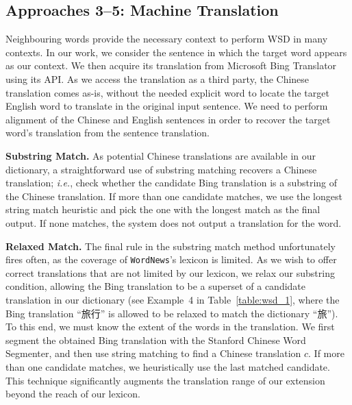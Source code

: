 \begin{CJK}{UTF8}{gbsn}
\subsection{Approaches 3--5: Machine Translation}

Neighbouring words provide the necessary context to perform WSD in
many contexts. In our work, we consider the sentence in which the
target word appears as our context. We then acquire its translation
from Microsoft Bing
Translator using its
API.  As we access the translation as a third party, the Chinese
translation comes as-is, without the needed explicit word  to
locate the target English word to translate in the original input
sentence. We need to perform alignment of the Chinese and English
sentences in order to recover the target word's translation from the
sentence translation.

{\bf Substring Match.} As potential Chinese translations are
available in our dictionary, a straightforward use of substring
matching recovers a Chinese translation; {\it i.e.}, check whether the
candidate %
Bing translation is a substring of the Chinese translation. 
If more than one candidate matches, we use the longest
string match heuristic and pick the one with the longest match as the
final output. If none matches, the system does not output a translation
for the word.  

{\bf Relaxed Match.} The final rule in the substring match method
unfortunately fires often, as the coverage of {\tt WordNews}'s lexicon
is limited.  As we wish to offer correct translations that are not
limited by our lexicon, we relax our substring condition, allowing the
Bing translation to be a superset of a candidate translation in our
dictionary (see Example~4 in Table~\ref{table:wsd_1}, where the Bing
translation ``旅行'' is allowed to be relaxed to match the dictionary
``旅'').
To this end, we must know the extent of the words in the translation.
We first segment the obtained Bing translation with the Stanford
Chinese Word Segmenter, and then use string matching to find a Chinese
translation $c$.  
If more than one candidate matches, we heuristically 
use the last matched candidate. 
This technique significantly augments the
translation range of our extension beyond the reach of our lexicon.



\end{CJK}
